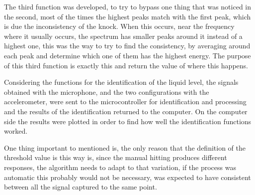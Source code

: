 The third function was developed, to try to bypass one thing that was noticed in the second, most of the times the highest peaks match with the first peak, which is due the inconsistency of the knock. When this occurs, near the frequency where it usually occurs, the spectrum has smaller peaks around it instead of a highest one, this was the way to try to find the consistency, by averaging around each peak and determine which one of them has the highest energy. The purpose of this third function is exactly this and return the value of where this happens.

Considering the functions for the identification of the liquid level, the signals obtained with the microphone, and the two configurations with the accelerometer, were sent to the microcontroller for identification and processing and the results of the identification returned to the computer. On the computer side the results were plotted in order to find how well the identification functions worked. 

One thing important to mentioned is, the only reason that the definition of the threshold value is this way is, since the manual hitting produces different responses, the algorithm needs to adapt to that variation, if the process was automatic this probably would not be necessary, was expected to have consistent between all the signal captured to the same point.   
